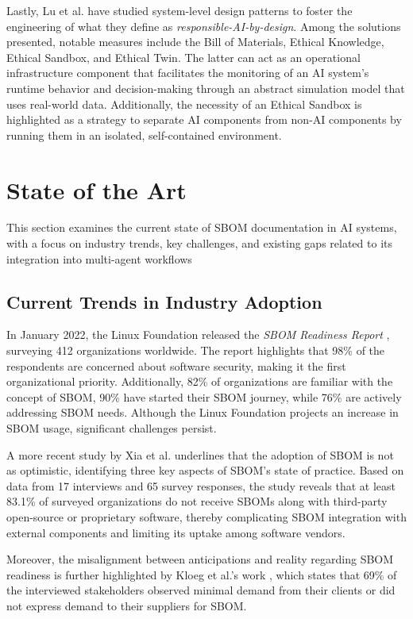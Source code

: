 Lastly, Lu et al. \cite{lu2023responsible} have studied system-level design patterns to foster the engineering of what they define as \textit{responsible-AI-by-design}. Among the solutions presented, notable measures include the Bill of Materials, Ethical Knowledge, Ethical Sandbox, and Ethical Twin. The latter can act as an operational infrastructure component that facilitates the monitoring of an AI system’s runtime behavior and decision-making through an abstract simulation model that uses real-world data. Additionally, the necessity of an Ethical Sandbox is highlighted as a strategy to separate AI components from non-AI components by running them in an isolated, self-contained environment.




\section{State of the Art} \label{sec:state_of_art}
This section examines the current state of SBOM documentation in AI systems, with a focus on industry trends, key challenges, and existing gaps related to its integration into multi-agent workflows

\subsection{Current Trends in Industry Adoption}
In January 2022, the Linux Foundation released the \textit{SBOM Readiness Report} \cite{sbom_readiness}, surveying 412 organizations worldwide. The report highlights that 98\% of the respondents are concerned about software security, making it the first organizational priority. Additionally, 82\% of organizations are familiar with the concept of SBOM, 90\% have started their SBOM journey, while 76\% are actively addressing SBOM needs. Although the Linux Foundation projects an increase in SBOM usage, significant challenges persist.

A more recent study by Xia et al. \cite{xia2024empirical} underlines that the adoption of SBOM is not as optimistic, identifying three key aspects of SBOM's state of practice. Based on data from 17 interviews and 65 survey responses, the study reveals that at least 83.1\% of surveyed organizations do not receive SBOMs along with third-party open-source or proprietary software, thereby complicating SBOM integration with external components and limiting its uptake among software vendors. 

Moreover, the misalignment between anticipations and reality regarding SBOM readiness is further highlighted by Kloeg et al.'s work \cite{kloeg2024charting}, which states that 69\% of the interviewed stakeholders observed minimal demand from their clients or did not express demand to their suppliers for SBOM. 

